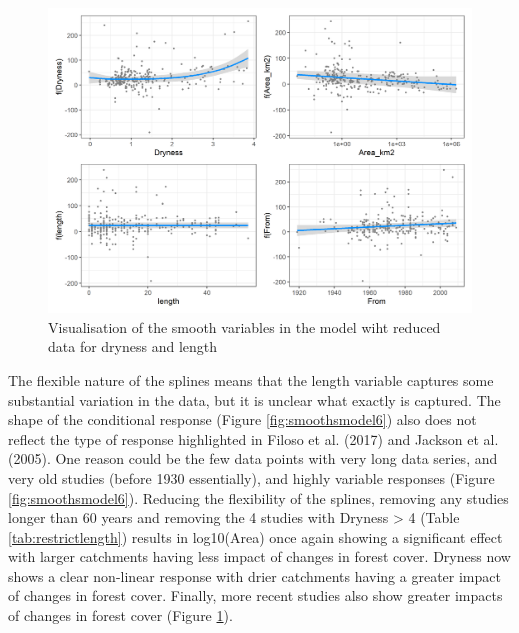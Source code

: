 \documentclass[]{elsarticle} %
\begin{document}
\begin{figure}
\includegraphics[width=0.9\linewidth]{model7_smooths} \caption{Visualisation of the smooth variables in the model wiht reduced data for dryness and length}\label{fig:smoothsmodel7}
\end{figure}

The flexible nature of the splines means that the length variable captures some substantial variation in the data, but it is unclear what exactly is captured. The shape of the conditional response (Figure \ref{fig:smoothsmodel6}) also does not reflect the type of response highlighted in Filoso et al. (2017) and Jackson et al. (2005). One reason could be the few data points with very long data series, and very old studies (before 1930 essentially), and highly variable responses (Figure \ref{fig:smoothsmodel6}). Reducing the flexibility of the splines, removing any studies longer than 60 years and removing the 4 studies with Dryness \textgreater{} 4 (Table \ref{tab:restrictlength}) results in log10(Area) once again showing a significant effect with larger catchments having less impact of changes in forest cover. Dryness now shows a clear non-linear response with drier catchments having a greater impact of changes in forest cover. Finally, more recent studies also show greater impacts of changes in forest cover (Figure \ref{fig:smoothsmodel7}).
\end{document}
